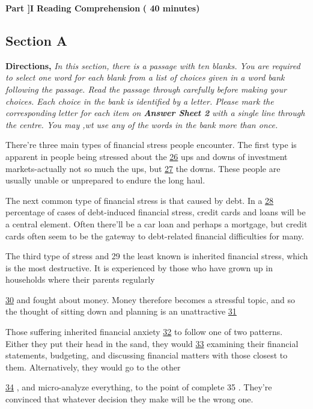 \documentclass[UTF8,11pt]{ctexart}
\begin{document}
\textbf{Part ]I} \textbf{Reading Comprehension} \textbf{( 40 minutes)}


\subsection*{\textbf{Section A}}


\textbf{Directions, }\textit{In this section, there is a passage with ten blanks. You are required to select one word for each} \textit{blank from a list of choices given in a word bank following the passage. Read the passage through carefully} \textit{before making your choices. Each choice in the bank is identified by a letter. Please mark the corresponding} \textit{letter for each item on }\textbf{\textit{Answer Sheet 2 }}\textit{with a single line through the centre. You may ,wt use any of the} \textit{words in the bank more than once.}


There're three main types of financial stress people encounter. The first type is apparent in people being stressed about the \uline{26} ups and downs of investment markets-actually not so much the ups, but \uline{27} the downs. These people are usually unable or unprepared to endure the long haul.


The next common type of financial stress is that caused by debt. In a \uline{28} percentage of cases of debt-induced financial stress, credit cards and loans will be a central element. Often there'll be a car loan and perhaps a mortgage, but credit cards often seem to be the gateway to debt-related financial difficulties for many.


The third type of stress and 29 the least known is inherited financial stress, which is the most destructive. It is experienced by those who have grown up in households where their parents regularly


\uline{30} and fought about money. Money therefore becomes a stressful topic, and so the thought of sitting down and planning is an unattractive \uline{31}


Those suffering inherited financial anxiety \uline{32} to follow one of two patterns. Either they put their head in the sand, they would \uline{33} examining their financial statements, budgeting, and discussing financial matters with those closest to them. Alternatively, they would go to the other


\uline{34} , and micro-analyze everything, to the point of complete 35 . They're convinced that whatever decision they make will be the wrong one.
\end{document}
